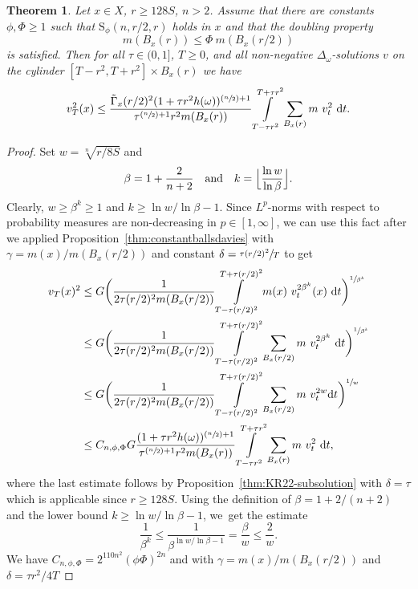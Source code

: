 \documentclass[JEP,XML,SOM,Unicode,published]{cedram}
\newcommand{\Psfrac}[2]{(\sfrac{#1}{#2})}
\newcommand{\rS}{\mathrm{S}}
\theoremstyle{plain}
\newtheorem{theorem}{Theorem}[section]
\theoremstyle{definition}
\newcommand{\drm}{\mathrm{d}}
\let\oldint\int
\renewcommand{\int}{\oldint\limits}
\begin{document}
\begin{theorem}\label{thm:l2meanvaluesturm} Let $ x\in X $, $r\geq
128 S$, $n>2$.
Assume that there are constants $\phi,\Phi\geq 1$ such that $\rS_{\phi}(n,r/2,r)$ holds in $ x $ and that the doubling property
\[
m(B_x(r))\leq \Phi\ m(B_x(r/2))
\]
is satisfied. Then for all $\tau\in(0,1]$, $T\geq 0$,
and all non-negative $\Delta_\omega$-solutions $v$ on the cylinder $[T-r^2,T+r^2]\times B_x(r)$ we have
\begin{align*}
v^2 _T(x)
\leq
\frac{\tilde\Gamma_x(r/2)^2(1+\tau r^2h(\omega))^{\Psfrac{n}{2}+1}}
{\tau^{\Psfrac{n}{2}+1}r^{2}m(B_x(r))}
\int\limits_{T-\tau r^2}^{T+ \tau r^2}\sum_{B_x(r)} m\ v_t^{2}\ \drm t.
\end{align*}
\end{theorem}
\begin{proof} Set {$w=\sqrt[n]{r/8S}$} and
\[
\beta=1+\frac{2}{n+2}\quad\text{and}\quad k=\Bigl\lfloor \frac{\ln w}{\ln \beta} \Bigr\rfloor.
\]
Clearly, $w\geq \beta^k{\ge1}$ and $k\geq \ln w/\ln \beta -1$.
Since $L^p$-norms with respect to probability measures are non-decreasing in $p\in[1,\infty]$,
we can use this fact after we applied Proposition~\ref{thm:constantballsdavies} with $\gamma=m(x)/m(B_x(r/2))$ and constant $\delta=\sfrac{\tau(r/2)^2}{T}$ to get
\begin{align*} v_T(x)^2
&\le G\biggl(\frac{1}{2 \tau(r/2)^2m(B_x(r/2))}\int\limits_{T- \tau (r/2)^2}^{T+ \tau (r/2)^2} m(x)\ v_t^{2\beta^{k}}(x)\ \drm t\biggr)^{\sfrac{1}{\beta^{k}}}
\\
&\le G\biggl(\frac{1}{2\tau (r/2)^2m(B_x(r/2))}\int\limits_{T- \tau (r/2)^2}^{T+ \tau (r/2)^2}\sum_{B_x( r/2)} m\ v_t^{2\beta^{k}}\ \drm t\biggr)^{\sfrac{1}{\beta^{k}}}
\\
&\leq G\biggl(\frac{1}{2\tau (r/2)^2m(B_x(r/2))}\int\limits_{T-\tau (r/2)^2}^{T+\tau (r/2)^2}\sum_{B_x( r/2)} m \ v_t^{2w}\drm t\biggr)^{\sfrac{1}{w}}\\
&\leq
C_{n,\phi,\Phi}G\frac{(1+\tau r^2h(\omega))^{\Psfrac{n}{2}+1}}
{\tau^{\Psfrac{n}{2}+1}r^{2}m(B_x(r))}
\int\limits_{T-\tau r^2}^{T+ \tau r^2}\sum_{B_x(r)} m\ v_t^{2}\ \drm t,
\end{align*}
where the last estimate follows by Proposition~\ref{thm:KR22-subsolution} with $\delta=\tau$ which is applicable since $r\ge 128S $. Using the definition of $\beta=1+2/(n+2)$ and the lower bound $k\geq \ln w/\ln \beta -1$, we~get the estimate
\[
\frac{1}{\beta^k}\leq \frac{1}{\beta^{\ln w/\ln \beta-1}}=\frac{\beta}{w}\leq \frac{2}{w}.
\]
We have $C_{n,\phi,\Phi}=2^{{110}n^2}(\phi\Phi)^{2n}$ and {with $ \gamma= m(x)/m(B_x(r/2))$ and $ \delta=\tau r^2 /4T $}

\end{proof}
\end{document}
